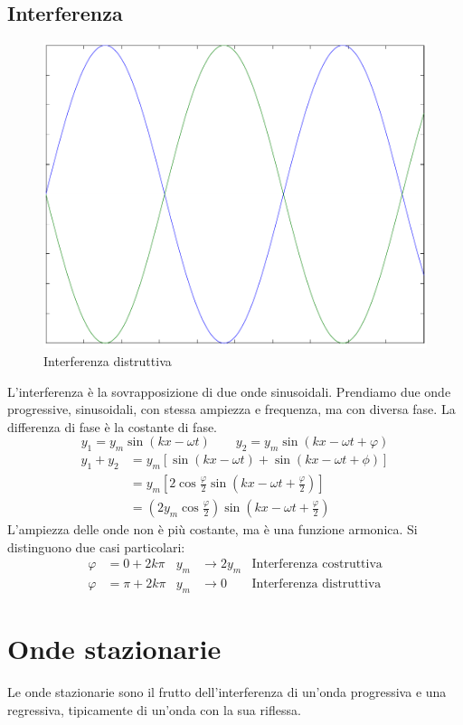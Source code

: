 \subsection{Interferenza}
\begin{figure}[htbp]
   \centering
   \includegraphics[scale=0.5]{immagini/fisica1/interferenza_distruttiva}
   \caption{Interferenza distruttiva}
\end{figure}
L'interferenza è la sovrapposizione di due onde sinusoidali. Prendiamo due onde progressive, sinusoidali, con stessa ampiezza e frequenza, ma con diversa fase. La differenza di fase è la costante di fase.
$$y_1=y_m\sin(kx-\omega t)\qquad y_2=y_m\sin(kx-\omega t+\varphi)$$
\begin{align*}
y_1+y_2&=y_m\left[\sin\left(kx-\omega t\right)+\sin\left(kx-\omega t+\phi\right)\right]\\
&=y_m\left[2\cos\frac{\varphi}{2}\sin\left(kx-\omega t+\frac{\varphi}{2}\right)\right]\\
&=\left(2y_m\cos\frac{\varphi}{2}\right)\sin\left(kx-\omega t+\frac{\varphi}{2}\right)
\end{align*}
L'ampiezza delle onde non è più costante, ma è una funzione armonica. Si distinguono due casi particolari:
\begin{align*}
\varphi&=0+2k\pi&y_m&\rightarrow 2y_m&\text{Interferenza costruttiva}\\
\varphi&=\pi+2k\pi&y_m&\rightarrow 0&\text{Interferenza distruttiva}
\end{align*}
\section{Onde stazionarie}
Le onde stazionarie sono il frutto dell'interferenza di un'onda progressiva e una regressiva, tipicamente di un'onda con la sua riflessa.

